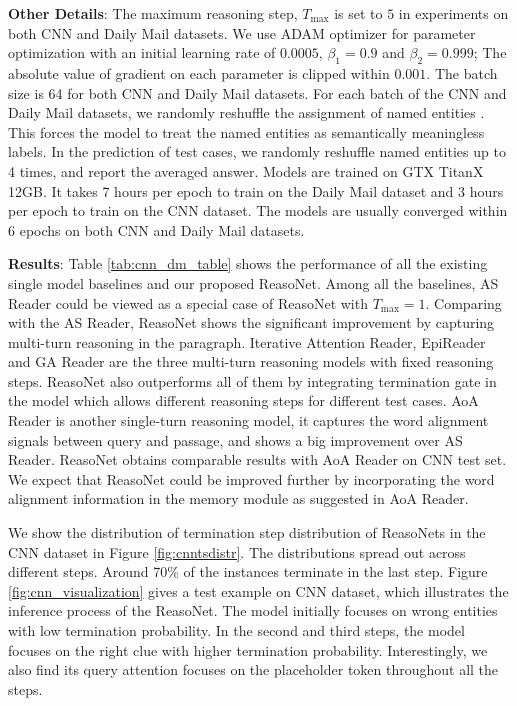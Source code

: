 \documentclass[sigconf]{acmart}
\begin{document}
\textbf{Other Details}: The maximum reasoning step, $T_{\text{max}}$ is set to $5$ in experiments on both CNN and Daily Mail datasets. We use ADAM optimizer \citep{KingmaICLR2015Adam} for parameter optimization with an initial learning rate of $0.0005$, $\beta_1 = 0.9$ and $\beta_2 = 0.999$; The absolute value of gradient on each parameter is clipped within $0.001$. The batch size is 64 for both CNN and Daily Mail datasets. For each batch of the CNN and Daily Mail datasets, we randomly reshuffle the assignment of named entities \citep{HermannNIPS2015}.
This forces the model to treat the named entities as semantically meaningless labels. In the prediction of test cases, we randomly reshuffle named entities up to 4 times, and report the averaged answer. Models are trained on GTX TitanX 12GB. It takes 7 hours per epoch to train on the Daily Mail dataset and 3 hours per epoch to train on the CNN dataset. The models are usually converged within 6 epochs on both CNN and Daily Mail datasets.




\textbf{Results}: Table \ref{tab:cnn_dm_table} shows the performance of all the existing single model baselines and our proposed ReasoNet. Among all the baselines, AS Reader could be viewed as a special case of ReasoNet with $T_{\text{max}} = 1$. Comparing with the AS Reader, ReasoNet shows the significant improvement by capturing multi-turn reasoning in the paragraph. Iterative Attention Reader, EpiReader and GA Reader are the three multi-turn reasoning models with fixed reasoning steps. ReasoNet also outperforms all of them by integrating termination gate in the model which allows different reasoning steps for different test cases. AoA Reader is another single-turn reasoning model, it captures the word alignment signals between query and passage, and shows a big improvement over AS Reader. ReasoNet obtains comparable results with AoA Reader on CNN test set. We expect that ReasoNet could be improved further by incorporating the word alignment information in the memory module as suggested in AoA Reader. 

We show the distribution of termination step distribution of ReasoNets in the CNN dataset in Figure \ref{fig:cnntsdistr}. The distributions spread out across different steps. Around 70\% of the instances terminate in the last step.
Figure \ref{fig:cnn_visualization} gives a test example on CNN dataset, which illustrates the inference process of the ReasoNet. The model initially focuses on wrong entities with low termination probability. In the second and third steps, the model focuses on the right clue with higher termination probability. Interestingly, we also find its query attention focuses on the placeholder token throughout all the steps. 
\end{document}
